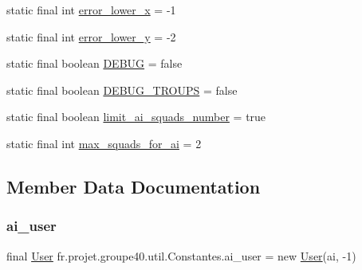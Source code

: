 \begin{DoxyCompactItemize}
\item 
static final int \hyperlink{classfr_1_1projet_1_1groupe40_1_1util_1_1_constantes_afc47dab9026574f1397d88cefeb47c6b}{error\+\_\+lower\+\_\+x} = -\/1
\item 
static final int \hyperlink{classfr_1_1projet_1_1groupe40_1_1util_1_1_constantes_acf4616f5c5c27a22df9a44bb0142c8ad}{error\+\_\+lower\+\_\+y} = -\/2
\item 
static final boolean \hyperlink{classfr_1_1projet_1_1groupe40_1_1util_1_1_constantes_ab1177197da83e8d896e32796e50799fe}{D\+E\+B\+UG} = false
\item 
static final boolean \hyperlink{classfr_1_1projet_1_1groupe40_1_1util_1_1_constantes_a58a90e1be21154f908e85f3f302a7adf}{D\+E\+B\+U\+G\+\_\+\+T\+R\+O\+U\+PS} = false
\item 
static final boolean \hyperlink{classfr_1_1projet_1_1groupe40_1_1util_1_1_constantes_a68d7ea5b02ac2fa94f2edabef7bd7793}{limit\+\_\+ai\+\_\+squads\+\_\+number} = true
\item 
static final int \hyperlink{classfr_1_1projet_1_1groupe40_1_1util_1_1_constantes_a2682082f9f3e56728af6066427a63a4a}{max\+\_\+squads\+\_\+for\+\_\+ai} = 2
\end{DoxyCompactItemize}


\subsection{Member Data Documentation}
\mbox{\label{classfr_1_1projet_1_1groupe40_1_1util_1_1_constantes_a8445e21423d9e557d2cbdc37c99513ff}} 
\subsubsection{\texorpdfstring{ai\+\_\+user}{ai\_user}}
{\footnotesize\ttfamily final \hyperlink{classfr_1_1projet_1_1groupe40_1_1client_1_1_user}{User} fr.\+projet.\+groupe40.\+util.\+Constantes.\+ai\+\_\+user = new \hyperlink{classfr_1_1projet_1_1groupe40_1_1client_1_1_user}{User}(ai, -\/1)\hspace{0.3cm}{\ttfamily [static]}}

\mbox{\label{classfr_1_1projet_1_1groupe40_1_1util_1_1_constantes_ad120e42952260b4b09723a1de78585b2}} 
